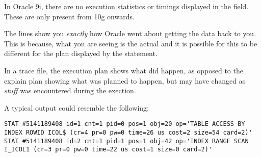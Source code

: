 In Oracle 9i, there are no execution statistics or timings displayed in the  field. These are only present from 10g onwards.

The  lines show you \emph{exactly} how Oracle went about getting the data back to you. This is because, what you are seeing is the actual  and it is possible for this to be different for the plan displayed by the  statement. 

\begin{note}
In a trace file, the execution plan shows what did happen, as opposed to the explain plan showing what was planned to happen, but may have changed as \emph{stuff} was encountered during the exection.
\end{note}

A typical  output could resemble the following:

\begin{lstlisting}[numbers=none,caption={Stat Line}]
STAT #5141189408 id=1 cnt=1 pid=0 pos=1 obj=20 op='TABLE ACCESS BY INDEX ROWID ICOL$ (cr=4 pr=0 pw=0 time=26 us cost=2 size=54 card=2)'
STAT #5141189408 id=2 cnt=1 pid=1 pos=1 obj=42 op='INDEX RANGE SCAN I_ICOL1 (cr=3 pr=0 pw=0 time=22 us cost=1 size=0 card=2)'
\end{lstlisting}

